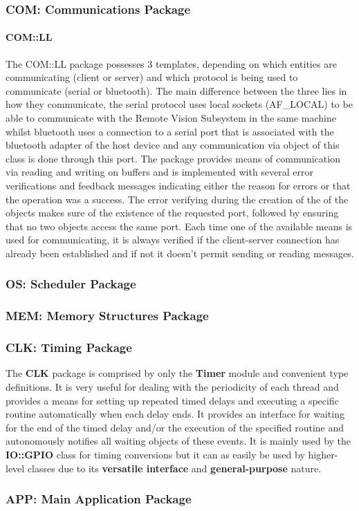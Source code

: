 \subsubsection{COM: Communications Package}
\paragraph{COM::LL}
The COM::LL package possesses 3 templates, depending on which entities are communicating (client or server) and which protocol is being used to communicate (serial or bluetooth). The main difference between the three lies in how they communicate, the serial protocol uses local sockets (AF\_LOCAL) to be able to communicate with the Remote Vision Subsystem in the same machine whilst bluetooth uses a connection to a serial port that is associated with the bluetooth adapter of the host device and any communication via object of this class is done through this port.
The package provides means of communication via reading and writing on buffers and is implemented with several error verifications and feedback messages indicating either the reason for errors or that the operation was a success. The error verifying during the creation of the of the objects makes sure of the existence of the requested port, followed by ensuring that no two objects access the same port. Each time one of the available means is used for communicating, it is always verified if the client-server connection has already been established and if not it doesn't permit sending or reading messages.
%
\subsubsection{OS: Scheduler Package}
%
\subsubsection{MEM: Memory Structures Package}
%
\subsubsection{CLK: Timing Package}
The \textbf{CLK} package is comprised by only the \textbf{Timer} module and convenient type definitions. It is very useful for dealing with the periodicity of each thread and provides a means for setting up repeated timed delays and executing a specific routine automatically when each delay ends. It provides an interface for waiting for the end of the timed delay and/or the execution of the specified routine and autonomously notifies all waiting objects of these events.
It is mainly used by the \textbf{IO::GPIO} class for timing conversions but it can as easily be used by higher-level classes due to its \textbf{versatile interface} and \textbf{general-purpose} nature.
%
\subsubsection{APP: Main Application Package}
%